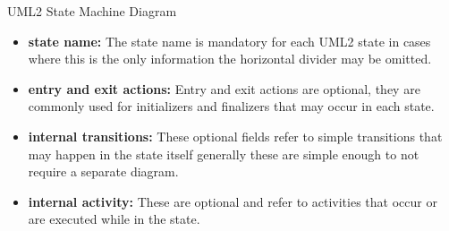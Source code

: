 \begin{definition}
UML2 State Machine Diagram

\label{def:uml2}
\begin{itemize}
	\item \textbf{state name:} The state name is mandatory for each UML2 state in cases where this is the only information the horizontal divider may be omitted.
	\item \textbf{entry and exit actions:} Entry and exit actions are optional, they are commonly used for initializers and finalizers that may occur in each state.
	\item \textbf{internal transitions:} These optional fields refer to simple transitions that may happen in the state itself generally these are simple enough to not require a separate diagram.
	\item \textbf{internal activity:} These are optional and refer to activities that occur or are executed while in the state.
\end{itemize}
\end{definition}
